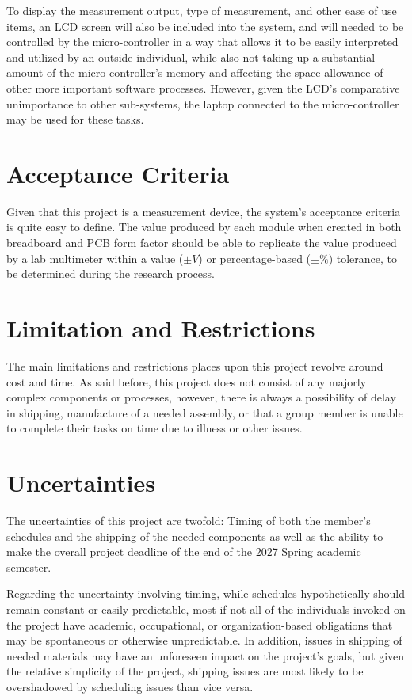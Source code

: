 \documentclass{article}
\begin{document}
    To display the measurement output, type of measurement, and other ease of use items, an LCD screen will also be included into the system, and will needed to be controlled by the micro-controller in a way that allows it to be easily interpreted and utilized by an outside individual, while also not taking up a substantial amount of the micro-controller's memory and affecting the space allowance of other more important software processes.
    However, given the LCD's comparative unimportance to other sub-systems, the laptop connected to the micro-controller may be used for these tasks.

    \section{Acceptance Criteria}
    Given that this project is a measurement device, the system's acceptance criteria is quite easy to define.
    The value produced by each module when created in both breadboard and PCB form factor should be able to replicate the value produced by a lab multimeter within a value ($\pm V$) or percentage-based ($\pm \%$) tolerance, to be determined during the research process.
    \section{Limitation and Restrictions}
    The main limitations and restrictions places upon this project revolve around cost and time.
    As said before, this project does not consist of any majorly complex components or processes, however, there is always a possibility of delay in shipping, manufacture of a needed assembly, or that a group member is unable to complete their tasks on time due to illness or other issues.

    \section{Uncertainties}
    The uncertainties of this project are twofold: Timing of both the member's schedules and the shipping of the needed components as well as the ability to make the overall project deadline of the end of  the 2027 Spring academic semester.

    Regarding the uncertainty involving timing, while schedules hypothetically should remain constant or easily predictable, most if not all of the individuals invoked on the project have academic, occupational, or organization-based obligations that may be spontaneous or otherwise unpredictable.
    In addition, issues in shipping of needed materials may have an unforeseen impact on the project's goals, but given the relative simplicity of the project, shipping issues are most likely to be overshadowed by scheduling issues than vice versa.
\end{document}
